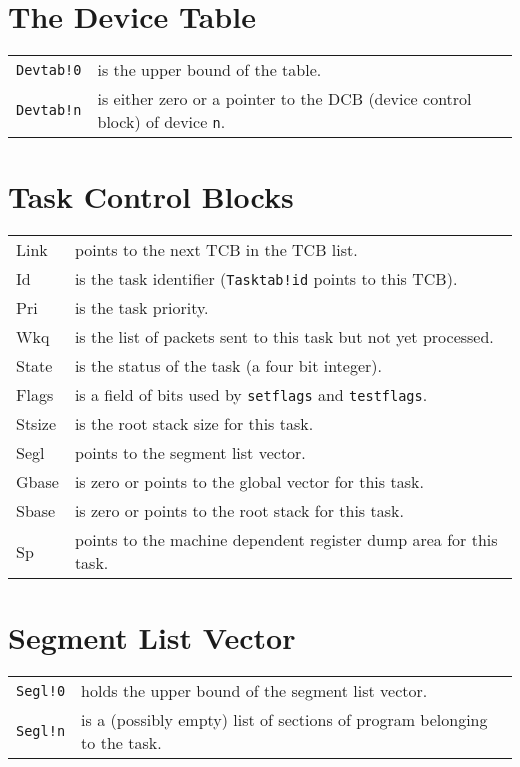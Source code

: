 \section{The Device Table}

\begin{tabular}{lp{8.5cm}}
     \verb|Devtab!0|&is the upper bound of the table.\\
     \verb|Devtab!n|&is either zero or a pointer to the DCB (device
     control block) of device \verb|n|.\\
\end{tabular}
     
\section{Task Control Blocks}

\begin{tabular}{lp{8.5cm}}
     Link&points to the next TCB in the TCB list.\\
     Id&is the task identifier (\verb|Tasktab!id| points to this TCB).\\
     Pri&is the task priority.\\
     Wkq&is the list of packets sent to this task but not yet processed. \\
     State&is the status of the task (a four bit integer).\\
     Flags&is a field of bits used by \verb|setflags| and \verb|testflags|.\\
     Stsize&is the root stack size for this task.\\
     Segl&points to the segment list vector.\\
     Gbase&is zero or points to the global vector for this task.\\
     Sbase&is zero or points to the root stack for this task.\\
     Sp&points to the machine dependent register dump area for this task.\\
\end{tabular}

\section{Segment List Vector}

\begin{tabular}{lp{8.5cm}}
     \verb|Segl!0|&holds the upper bound of the segment list vector.\\
     \verb|Segl!n|&is a (possibly empty) list of sections of program 
              belonging to the task.\\
\end{tabular}

